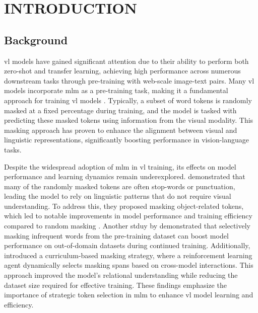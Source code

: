 \setlength{\parindent}{0in}
\setlength{\parskip}{1.5mm}
\setlength{\baselineskip}{1.6em}

\chapter{INTRODUCTION}
\section{Background}
\acrfull{vl} models have gained significant attention due to their ability to perform both zero-shot and transfer learning, achieving high performance across numerous downstream tasks through pre-training with web-scale image-text pairs.
Many \acrshort{vl} models incorporate \acrfull{mlm} as a pre-training task, making it a fundamental approach for training \acrshort{vl} models \cite{albef, mplug, uniter, beit-3}.
Typically, a subset of word tokens is randomly masked at a fixed percentage during training, and the model is tasked with predicting these masked tokens using information from the visual modality.
This masking approach has proven to enhance the alignment between visual and linguistic representations, significantly boosting performance in vision-language tasks.

Despite the widespread adoption of \acrshort{mlm} in \acrshort{vl} training, its effects on model performance and learning dynamics remain underexplored.
 demonstrated that many of the randomly masked tokens are often stop-words or punctuation, leading the model to rely on linguistic patterns that do not require visual understanding.
To address this, they proposed masking object-related tokens, which led to notable improvements in model performance and training efficiency compared to random masking \cite{mask_object}.
Another stduy by  demonstrated that selectively masking infrequent words from the pre-training dataset can boost model performance on out-of-domain datasets during continued training.
Additionally,  introduced a curriculum-based masking strategy, where a reinforcement learning agent dynamically selects masking spans based on cross-model interactions. This approach improved the model's relational understanding while reducing the dataset size required for effective training.
These findings emphasize the importance of strategic token selection in \acrshort{mlm} to enhance \acrshort{vl} model learning and efficiency.


